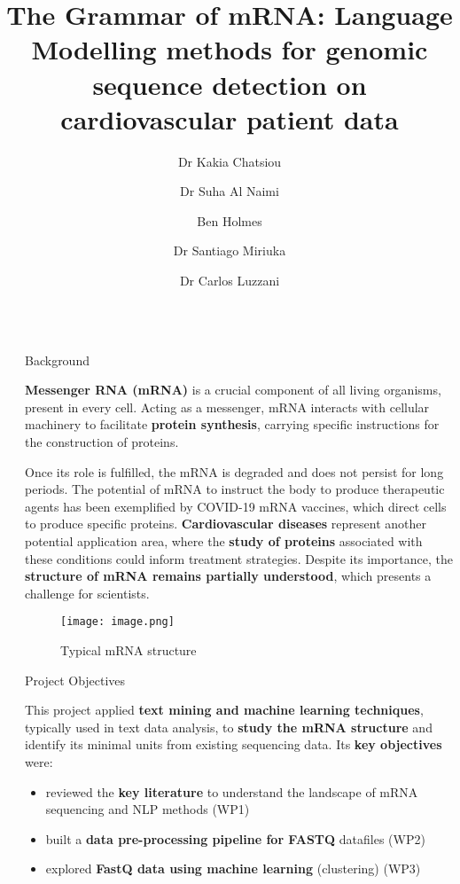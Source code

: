 \documentclass[final]{beamer}
\title{The Grammar of mRNA: Language Modelling methods for genomic sequence detection on cardiovascular patient data}
\author{Dr Kakia Chatsiou \inst{1} \and Dr Suha Al Naimi \inst{1} \and Ben Holmes\inst{1} \and Dr Santiago Miriuka \inst{2} \and Dr Carlos Luzzani \inst{2} }
\institute[shortinst]{\inst{1} \textit{University of Suffolk, UK} \samelineand \inst{2} MultiplAI
}
\newlength{\sepwidth}
\newlength{\colwidth}
\newcommand{\separatorcolumn}{\begin{column}{\sepwidth}\end{column}}
\begin{document}
\begin{frame}[t]
\begin{columns}[t]
\separatorcolumn

\begin{column}{\colwidth}

  \begin{block}{Background}

\textbf{Messenger RNA (mRNA)} is a crucial component of all living organisms, present in every cell. Acting as a messenger, mRNA interacts with cellular machinery to facilitate \textbf{protein synthesis}, carrying specific instructions for the construction of proteins. 

Once its role is fulfilled, the mRNA is degraded and does not persist for long periods. The potential of mRNA to instruct the body to produce therapeutic agents has been exemplified by COVID-19 mRNA vaccines, which direct cells to produce specific proteins. \textbf{Cardiovascular diseases} represent another potential application area, where the \textbf{study of proteins} associated with these conditions could inform treatment strategies. Despite its importance, the \textbf{structure of mRNA remains partially understood}, which presents a challenge for scientists. 


   \begin{figure}
       \centering
       \texttt{[image: image.png]}
       \caption{Typical mRNA structure}
       \label{fig:fig1}
   \end{figure}
   
\end{block}

\begin{block}{Project Objectives}

This project applied\textbf{ text mining and machine learning techniques}, typically used in text data analysis, to \textbf{study the mRNA structure} and identify its minimal units from existing sequencing data. Its \textbf{key objectives} were: 

\begin{itemize}
    \item reviewed the\textbf{ key literature} to understand the landscape of mRNA sequencing and NLP methods (WP1)
    \item built a \textbf{data pre-processing pipeline for FASTQ} datafiles (WP2)
    \item  explored \textbf{FastQ data using machine learning} (clustering) (WP3)
\end{itemize}


\end{block}
\end{column}
\end{columns}
\end{frame}
\end{document}
